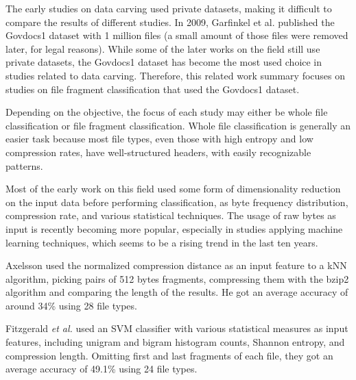 
The early studies on data carving used private datasets, making it difficult to compare the results of different studies. In 2009, Garfinkel et al. \cite{garfinkel_bringing_2009} published the Govdocs1 dataset with 1 million files (a small amount of those files were removed later, for legal reasons). While some of the later works on the field still use private datasets, the Govdocs1 dataset has become the most used choice in studies related to data carving.
Therefore, this related work summary focuses on studies on file fragment classification that used the Govdocs1 dataset.

Depending on the objective, the focus of each study may either be whole file classification or file fragment classification. Whole file classification is generally an easier task because most file types, even those with high entropy and low compression rates, have well-structured headers, with easily recognizable patterns.

Most of the early work on this field used some form of dimensionality reduction on the input data before performing classification, as byte frequency distribution, compression rate, and various statistical techniques. The usage of raw bytes as input is recently becoming more popular, especially in studies applying machine learning techniques, which seems to be a rising trend in the last ten years.


Axelsson \cite{axelsson_normalised_2010} used the normalized compression distance as an input feature to a kNN algorithm, picking pairs of 512 bytes fragments, compressing them with the bzip2 algorithm and comparing the length of the results.
He got an average accuracy of around 34\% using 28 file types.


Fitzgerald \textit{et al.} \cite{fitzgerald_using_2012}  used an SVM classifier with various statistical measures as input features, including unigram and bigram histogram counts, Shannon entropy, and compression length.
Omitting first and last fragments of each file, they got an average accuracy of 49.1\% using 24 file types.

